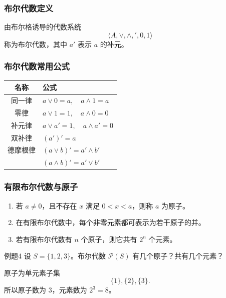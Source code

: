\subsubsection{布尔代数定义}

由布尔格诱导的代数系统
\[
\langle A,\vee,\wedge,{}'\!,0,1\rangle
\]
称为布尔代数，其中 \(a'\) 表示 \(a\) 的补元。

\subsubsection{布尔代数常用公式}

\begin{center}
	\begin{tabular}{cl}
		\toprule
		名称 & 公式\\
		\midrule
		同一律 & \(a\vee0=a,\quad a\wedge1=a\)\\
		零律 & \(a\vee1=1,\quad a\wedge0=0\)\\
		补元律 & \(a\vee a'=1,\quad a\wedge a'=0\)\\
		双补律 & \((a')'=a\)\\
		德摩根律 & \((a\vee b)'=a'\wedge b'\)\\
		          & \((a\wedge b)'=a'\vee b'\)\\
		\bottomrule
	\end{tabular}
\end{center}

\subsubsection{有限布尔代数与原子}

\begin{enumerate}
	\item 若 \(a\ne0\)，且不存在 \(x\) 满足 \(0<x<a\)，则称 \(a\) 为原子。
	\item 在有限布尔代数中，每个非零元素都可表示为若干原子的并。
	\item 若有限布尔代数有 \(n\) 个原子，则它共有 \(2^n\) 个元素。
\end{enumerate}

\begin{question}{例题4}
	设 \(S=\{1,2,3\}\)。布尔代数 \(\mathcal{P}(S)\) 有几个原子？共有几个元素？
	
	\begin{solution}
	原子为单元素子集
	\[
	\{1\},\{2\},\{3\}.
	\]
	所以原子数为 \(3\)，元素数为 \(2^3=8\)。
	\end{solution}
\end{question}

